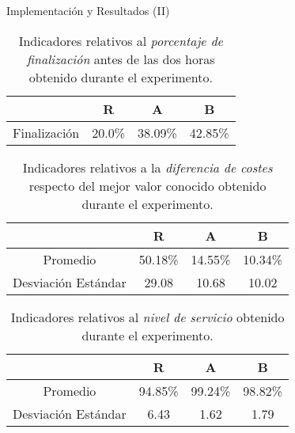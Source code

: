 \documentclass[8pt]{beamer}
\begin{document}
  \begin{frame}{Implementación y Resultados (II)}
    \begin{table}[!ht]
      \centering
      \begin{tabu}{ | c | c | c | c |}
        \hline
        &\bfseries R & \bfseries A & \bfseries B
        \\\hline Finalización & 20.0\% & 38.09\% & 42.85\%
        \\\hline
      \end{tabu}
      \caption{Indicadores relativos al \emph{porcentaje de finalización} antes de las dos horas obtenido durante el experimento.}
      \label{table:ending_summary}
    \end{table}

    \begin{table}[!ht]
      \centering
      \begin{tabu}{ | c | c | c | c |}
        \hline
        &\bfseries R & \bfseries A & \bfseries B
        \\\hline Promedio & 50.18\% & 14.55\% & 10.34\%
        \\\hline Desviación Estándar & 29.08 & 10.68 & 10.02
        \\\hline
      \end{tabu}
      \caption{Indicadores relativos a la \emph{diferencia de costes} respecto del mejor valor conocido obtenido durante el experimento.}
      \label{table:costs_summary}
    \end{table}

    \begin{table}[!ht]
      \centering
      \begin{tabu}{ | c | c | c | c |}
        \hline
        &\bfseries R & \bfseries A & \bfseries B
        \\\hline Promedio & 94.85\% & 99.24\% & 98.82\%
        \\\hline Desviación Estándar & 6.43 & 1.62 & 1.79
        \\\hline
      \end{tabu}
      \caption{Indicadores relativos al \emph{nivel de servicio} obtenido durante el experimento.}
      \label{table:service_summary}
    \end{table}
  \end{frame}
\end{document}
